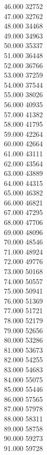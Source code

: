{ 46.000	32752 \\
 47.000	32762 \\
 48.000	34468 \\
 49.000	34963 \\
 50.000	35337 \\
 51.000	36448 \\
 52.000	36766 \\
 53.000	37259 \\
 54.000	37544 \\
 55.000	38026 \\
 56.000	40935 \\
 57.000	41382 \\
 58.000	41795 \\
 59.000	42264 \\
 60.000	42664 \\
 61.000	43111 \\
 62.000	43564 \\
 63.000	43889 \\
 64.000	44315 \\
 65.000	46382 \\
 66.000	46821 \\
 67.000	47295 \\
 68.000	47706 \\
 69.000	48096 \\
 70.000	48546 \\
 71.000	48924 \\
 72.000	49776 \\
 73.000	50168 \\
 74.000	50557 \\
 75.000	50941 \\
 76.000	51369 \\
 77.000	51721 \\
 78.000	52179 \\
 79.000	52656 \\
 80.000	53286 \\
 81.000	53673 \\
 82.000	54255 \\
 83.000	54683 \\
 84.000	55075 \\
 85.000	55446 \\
 86.000	57565 \\
 87.000	57978 \\
 88.000	58311 \\
 89.000	58758 \\
 90.000	59273 \\
 91.000	59728 \\
}
